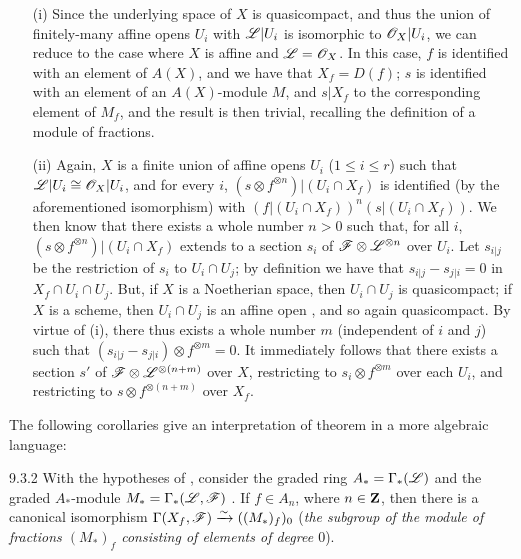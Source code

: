 \documentclass[10pt,oneside]{book}
\begin{document}
\begin{itemize}
  \item[(i)] Since the underlying space of $X$ is quasicompact, and thus the union of
             finitely-many affine opens $U_i$ with $\mathscr{L}|U_i$ is isomorphic to
             $\mathscr{O}_X|U_i$, we can reduce to the case where $X$ is affine and $\mathscr{L}=\mathscr{O}_X$.
             In this case, $f$ is identified with an element of $A(X)$, and we have that
             $X_f=D(f)$; $s$ is identified with an element of an $A(X)$-module $M$, and
             $s|X_f$ to the corresponding element of $M_f$, and the result is then trivial,
             recalling the definition of a module of fractions.
  \item[(ii)] Again,
              $X$ is a finite union of affine opens $U_i$ ($1\leqslant i\leqslant r$)
              such that $\mathscr{L}|U_i\cong\mathscr{O}_X|U_i$, and for every $i$,
              $(s\otimes f^{\otimes n})|(U_i\cap X_f)$ is identified (by the aforementioned
              isomorphism) with $(f|(U_i\cap X_f))^n(s|(U_i\cap X_f))$. We then know
               that there exists a whole number $n>0$ such that, for all
              $i$, $(s\otimes f^{\otimes n})|(U_i\cap X_f)$ extends to a section $s_i$ of
              $\mathscr{F}\otimes\mathscr{L}^{\otimes n}$ over $U_i$. Let $s_{i|j}$ be the restriction
              of $s_i$ to $U_i\cap U_j$; by definition we have that $s_{i|j}-s_{j|i}=0$ in
              $X_f\cap U_i\cap U_j$. But, if $X$ is a Noetherian space, then $U_i\cap U_j$ is
              quasicompact; if $X$ is a scheme, then $U_i\cap U_j$ is an affine open
              , and so again quasicompact. By virtue of (i), there thus
              exists a whole number $m$ (independent of $i$ and $j$) such that
              $(s_{i|j}-s_{j|i})\otimes f^{\otimes m}=0$. It immediately follows that there
              exists a section $s'$ of $\mathscr{F}\otimes\mathscr{L}^{\otimes(n+m)}$ over $X$,
              restricting to $s_i\otimes f^{\otimes m}$ over each $U_i$, and restricting to
              $s\otimes f^{\otimes(n+m)}$ over $X_f$.
\end{itemize}

The following corollaries give an interpretation of theorem  in a more
algebraic language:
\begin{envs}[Corollary]{9.3.2}
\label{cor-1.9.3.2}
With the hypotheses of , consider the graded ring $A_*=\Gamma_*(\mathscr{L})$
and the graded $A_*$-module $M_*=\Gamma_*(\mathscr{L},\mathscr{F})$ . If $f\in A_n$,
where $n\in\mathbf{Z}$, then there is a canonical isomorphism
$\Gamma(X_f,\mathscr{F})\xrightarrow{\sim}((M_*)_f)_0$ (\emph{the subgroup of the module of
fractions $(M_*)_f$ consisting of elements of degree $0$}).
\end{envs}
\end{document}
